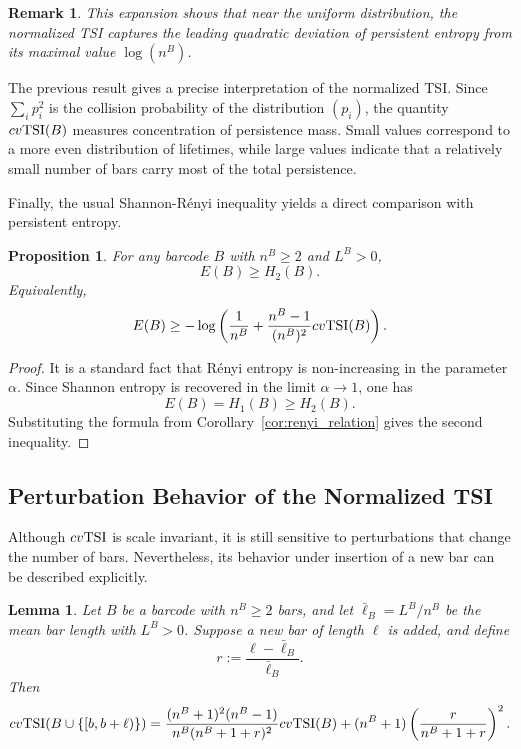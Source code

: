 \documentclass[11pt]{amsart}
\newtheorem*{remark}{Remark}
\newtheorem{prop}{Proposition}[section]
\newtheorem{lemma}[theorem]{Lemma}
\theoremstyle{definition}
\newcommand{\tsi}[0]{\textup{TSI}}
\begin{document}
\begin{remark}\rm
This expansion shows that near the uniform distribution, the normalized TSI captures the leading quadratic deviation of persistent entropy from its maximal value $\log(n^B)$.
\end{remark}




The previous result gives a precise interpretation of the normalized TSI. Since $\sum_i p_i^2$ is the collision probability of the distribution $(p_i)$, the quantity $cv\tsi(B)$ measures concentration of persistence mass. Small values correspond to a more even distribution of lifetimes, while large values indicate that a relatively small number of bars carry most of the total persistence.

Finally, the usual Shannon-Rényi inequality \cite{renyi1961} yields a direct comparison with persistent entropy.

\begin{prop}\label{prop:entropy_bound}
For any barcode $B$ with $n^B\geq 2$ and $L^B>0$,
\begin{equation}
E(B)\geq H_2(B).
\end{equation}
Equivalently,
\begin{equation}
E(B)\geq -\log\left(
\frac{1}{n^B}
+
\frac{n^B-1}{(n^B)^2}cv\tsi(B)
\right).
\end{equation}
\end{prop}

\begin{proof}
It is a standard fact that Rényi entropy is non-increasing in the parameter $\alpha$. Since Shannon entropy is recovered in the limit $\alpha\to 1$, one has
\[
E(B)=H_1(B)\geq H_2(B).
\]
Substituting the formula from Corollary~\ref{cor:renyi_relation} gives the second inequality.
\end{proof}



\subsection{Perturbation Behavior of the Normalized TSI}

Although $cv\tsi$ is scale invariant, it is still sensitive to perturbations that change the number of bars. Nevertheless, its behavior under insertion of a new bar can be described explicitly.

\begin{lemma}\label{lemma:cvtsi_added_bar}
Let $B$ be a barcode with $n^B\geq 2$ bars, and let $\bar{\ell}_B=L^B/n^B$ be the mean bar length with $L^B>0$. Suppose a new bar of length $\ell$ is added, and define
\[
r:=\frac{\ell-\bar{\ell}_B}{\bar{\ell}_B}.
\]
Then
\begin{equation}
cv\tsi(B\cup\{[b,b+\ell)\})
=
\frac{(n^B+1)^2(n^B-1)}{n^B(n^B+1+r)^2}cv\tsi(B)
+
(n^B+1)\left(\frac{r}{n^B+1+r}\right)^2.
\end{equation}
\end{lemma}
\end{document}
